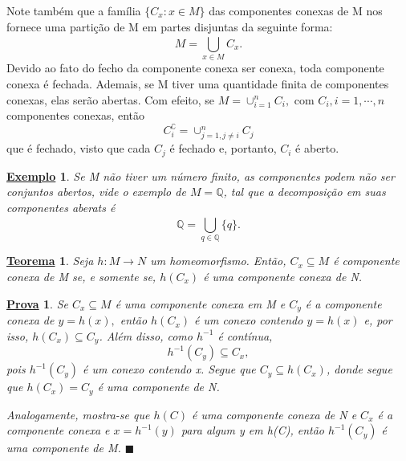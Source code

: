 \documentclass{article}
\newtheorem*{theorem*}{\underline{Teorema}}
\newtheorem{example}{\underline{Exemplo}}
\newtheorem*{proof*}{\underline{Prova}}
\renewcommand\qedsymbol{$\blacksquare$}
\begin{document}
  Note também que a família \(\{C_{x}: x\in M\}\) das componentes conexas de M nos fornece uma partição de M
em partes disjuntas da seguinte forma: 
  \[
    M = \bigcup_{x\in M}^{}{C_{x}}.
  \]
  Devido ao fato do fecho da componente conexa ser conexa, toda componente conexa é fechada. Ademais, se M tiver uma quantidade finita de componentes conexas,
elas serão abertas. Com efeito, se \(M = \cup_{i=1}^{n}C_{i},\) com \(C_{i}, i = 1,\cdots,n\) componentes conexas, então 
  \[
    C_{i}^{\complement} = \cup_{j=1, j\neq i}^{n}C_{j}
  \]
  que é fechado, visto que cada \(C_{j}\) é fechado e, portanto, \(C_{i}\) é aberto.
 \begin{example}
   Se M não tiver um número finito, as componentes podem não ser conjuntos abertos, vide o exemplo de \(M = \mathbb{Q}\), tal que a decomposição em suas componentes aberats é 
     \[
       \mathbb{Q} = \bigcup_{q\in \mathbb{Q}}^{}{\{q\}}.
     \]
 \end{example}
 \begin{theorem*}
   Seja \(h:M\rightarrow N\) um homeomorfismo. Então, \(C_{x}\subseteq{M}\) é componente conexa de M se, e somente se,
 \(h(C_{x})\) é uma componente conexa de N.
 \end{theorem*}
\begin{proof*}
  Se \(C_{x}\subseteq{M}\) é uma componente conexa em M e \(C_{y}\) é a componente conexa de \(y=h(x),\) então \(h(C_{x})\) é
um conexo contendo \(y = h(x)\) e, por isso, \(h(C_{x})\subseteq{C_{y}}\). Além disso, como \(h^{-1}\) é contínua, 
  \[
    h^{-1}(C_{y})\subseteq{C_{x}},
  \]
  pois \(h^{-1}(C_{y})\) é um conexo contendo x. Segue que \(C_{y}\subseteq{h(C_{x})}\), donde segue que \(h(C_{x}) = C_{y}\) é 
uma componente de N.

  Analogamente, mostra-se que \(h(C)\) é uma componente conexa de N e \(C_{x}\) é a componente conexa e \(x=h^{-1}(y)\) para algum y em h(C), então
 \(h^{-1}(C_{y})\) é uma componente de M. \qedsymbol
\end{proof*}
\end{document}
